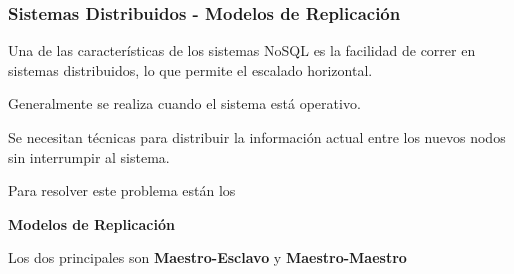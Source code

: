 
\begin{frame}
    \frametitle{Sistemas Distribuidos - Modelos de Replicación}

    Una de las características de los sistemas NoSQL es la facilidad de correr en sistemas distribuidos, lo que permite el escalado horizontal.

     

    Generalmente se realiza cuando el sistema está operativo.

     
    
    Se necesitan técnicas para distribuir la información actual entre los nuevos nodos sin interrumpir al sistema.

     

    Para resolver este problema están los 
    
    \begin{center}
        \textbf{Modelos de Replicación}
    \end{center}

     

    Los dos principales son \textbf{Maestro-Esclavo} y \textbf{Maestro-Maestro}
    
\end{frame}

